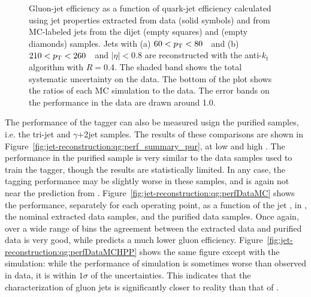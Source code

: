 \begin{figure}[!htp]
\begin{center}
\caption{ Gluon-jet efficiency as a function of quark-jet efficiency calculated using jet 
properties extracted from data (solid symbols) and from MC-labeled jets
from the dijet \Pythia (empty squares) and \Herwigpp (empty diamonds) samples. 
Jets with (a) $60<p_{\text{T}}<80$~\GeV\ and (b) $210<p_{\text{T}}<260$~\GeV\  and $|\eta|<0.8$
are reconstructed with the anti-$k_t$ algorithm with $R=0.4$.
The shaded band shows the total systematic uncertainty on the data. The bottom of the plot
shows the ratios of each MC simulation to the data. The error bands on the performance
in the data are drawn around 1.0. 
}
\label{fig:jet-reconstruction:qg:perf_summary}
\end{center}
\end{figure}

The performance of the tagger can also be measured usign the purified samples, i.e. the tri-jet and $\gamma$+2jet samples. The results of these comparisons are shown in Figure~\ref{fig:jet-reconstruction:qg:perf_summary_pur}, at low \pt and high \pt. The performance in the purified sample is very similar to the data samples used to train the tagger, though the results are statistically limited. In any case, the tagging performance may be slightly worse in these samples, and is again not near the prediction from \Pythia. Figure~\ref{fig:jet-reconstruction:qg:perfDataMC} shows the performance, separately for each operating point, as a function of the jet \pt, in \Pythia, the nominal extracted data samples, and the purified data samples. Once again, over a wide range of \pt bins the agreement between the extracted data and purified data is very good, while \Pythia predicts a much lower gluon efficiency. Figure~\ref{fig:jet-reconstruction:qg:perfDataMCHPP} shows the same figure except with the \Herwigpp simulation: while the performance of simulation is sometimes worse than observed in data, it is within $1\sigma$ of the uncertainties. This indicates that the \Herwigpp characterization of gluon jets is significantly closer to reality than that of \Pythia.

